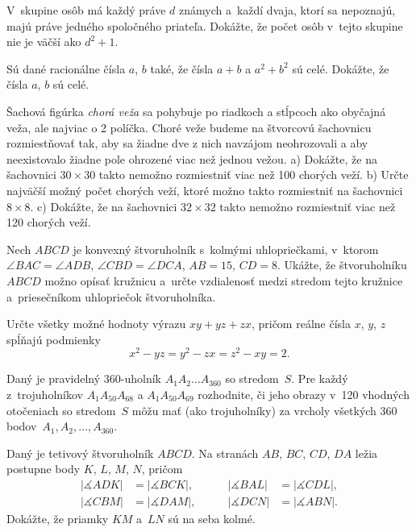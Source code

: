 {%
V~skupine osôb má každý práve $d$ známych a~každí dvaja, ktorí sa nepoznajú, majú práve jedného spoločného priateľa. Dokážte, že počet osôb v~tejto skupine nie je väčší ako $d^2+1$.}

{%
Sú dané racionálne čísla $a$, $b$ také, že čísla $a+b$ a $a^2+b^2$ sú celé. Dokážte, že čísla $a$, $b$ sú celé.}

{%
Šachová figúrka {\it chorá veža} sa pohybuje po riadkoch a stĺpcoch ako obyčajná veža, ale najviac o 2 políčka. Choré veže budeme
na štvorcovú šachovnicu rozmiestňovať tak, aby sa žiadne dve z nich navzájom neohrozovali a aby neexistovalo žiadne pole ohrozené viac než jednou vežou.
\ite a) Dokážte, že na šachovnici $30\times 30$ takto nemožno rozmiestniť viac než 100 chorých veží.
\ite b) Určte najväčší možný počet chorých veží, ktoré možno takto rozmiestniť na šachovnici~$8\times 8$.
\ite c) Dokážte, že na šachovnici $32\times 32$ takto nemožno rozmiestniť viac než 120 chorých veží.\endgraf\nopagebreak}

{%
Nech $ABCD$ je konvexný štvoruholník s~kolmými uhlopriečkami, v~ktorom $\angle BAC=\angle ADB$, $\angle CBD=\angle DCA$, $AB=15$, $CD=8$. Ukážte, že štvoruholníku $ABCD$ možno opísať kružnicu a~určte vzdialenosť medzi stredom tej\-to kružnice a~priesečníkom uhlopriečok štvoruholníka. }

{%
Určte všetky možné hodnoty výrazu $xy+yz+zx$, pričom reálne čísla $x$, $y$, $z$ spĺňajú podmienky $$x^2-yz=y^2-zx=z^2-xy=2.$$}

{%
Daný je pravidelný 360-uholník $A_1A_2\dots A_{360}$ so stredom~$S$. Pre každý z~trojuholníkov $A_1A_{50}A_{68}$ a $A_1A_{50}A_{69}$
rozhodnite, či jeho obrazy v~120 vhodných otočeniach so stredom~$S$ môžu mať (ako trojuholníky) za vrcholy všetkých 360 bodov~$A_1,A_2,\dots,A_{360}$.}

{%
Daný je tetivový štvoruholník $ABCD$. Na stranách $AB$, $BC$, $CD$, $DA$ ležia postupne body $K$, $L$, $M$, $N$, pričom
$$
\begin{alignat*}{2}
|\measuredangle ADK|&=|\measuredangle BCK|,&\qquad|\measuredangle BAL|&=|\measuredangle CDL|,\\
|\measuredangle CBM|&=|\measuredangle DAM|,&\qquad|\measuredangle DCN|&=|\measuredangle ABN|.
\end{alignat*}
$$
Dokážte, že priamky $KM$ a~$LN$ sú na seba kolmé.}

